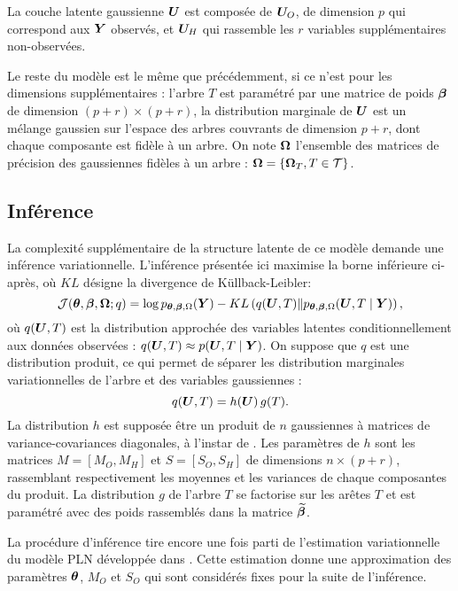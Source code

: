 La couche latente gaussienne ${\boldsymbol{U}}$ est composée de ${\boldsymbol{U}}_O$, de dimension $p$ qui correspond aux ${\boldsymbol{Y}}$ observés, et ${\boldsymbol{U}}_H$ qui rassemble les $r$ variables supplémentaires non-observées. 

Le reste du modèle est le même que précédemment, si ce n'est pour les dimensions supplémentaires : l'arbre $T$  est paramétré par une matrice de poids ${\boldsymbol{\beta}}$ de dimension $(p+r)\times (p+r)$, la distribution marginale de ${\boldsymbol{U}}$ est un mélange gaussien sur l'espace des arbres couvrants de dimension $p+r$, dont chaque composante est fidèle à un arbre. On note ${\boldsymbol{\Omega}}$ l'ensemble des matrices de précision des gaussiennes fidèles à un arbre : ${\boldsymbol{\Omega}} = \{{\boldsymbol{\Omega}}_T, T\in \mathcal{T}\}$. 
 
\subsection*{Inférence}
La complexité supplémentaire de la structure latente de ce modèle demande une inférence variationnelle. L'inférence présentée ici maximise la borne inférieure ci-après, où $KL$ désigne la divergence de Küllback-Leibler:
$${\mathcal{J}}({\boldsymbol{\theta}}, {\boldsymbol{\beta}}, {\boldsymbol{\Omega}}; q)= \log p_{{\boldsymbol{\theta}}, {\boldsymbol{\beta}}, \Omega}({\boldsymbol{Y}}) - KL\left(q({\boldsymbol{U}}, T) \| p_{{\boldsymbol{\theta}}, {\boldsymbol{\beta}}, \Omega}({\boldsymbol{U}}, T \mid {\boldsymbol{Y}}) \right), $$
où $q({\boldsymbol{U}}, T)$ est la distribution approchée des variables latentes conditionnellement aux données observées : $q({\boldsymbol{U}}, T)\approx p({\boldsymbol{U}}, T \mid {\boldsymbol{Y}})$. On suppose que $q$ est une distribution produit, ce qui permet de séparer les distribution marginales variationnelles de l'arbre et des variables gaussiennes :
$$q({\boldsymbol{U}}, T) = h({\boldsymbol{U}}) \,g(T).$$
La distribution $h$ est supposée être un produit de $n$ gaussiennes à matrices de variance-covariances diagonales, à l'instar de \citet{CMR18}. Les paramètres de $h$ sont les matrices $M=[M_O, M_H]$ et $S=[S_O, S_H]$ de dimensions $n\times (p+r)$, rassemblant respectivement les moyennes et les variances de chaque composantes du produit.
La distribution $g$ de l'arbre $T$ se factorise sur les arêtes $T$ et est paramétré avec des poids rassemblés dans la matrice $\widetilde{{\boldsymbol{\beta}}}$.

La procédure d'inférence tire encore une fois parti de l'estimation variationnelle du modèle PLN développée dans \citet{CMR18}. Cette estimation donne une approximation des paramètres ${\boldsymbol{\theta}}$, $M_O$ et $S_O$ qui sont considérés fixes pour la suite de l'inférence.

